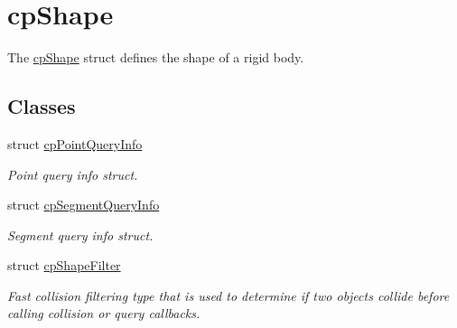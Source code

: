 \hypertarget{group__cp_shape}{}\section{cp\+Shape}
\label{group__cp_shape}


The \hyperlink{structcp_shape}{cp\+Shape} struct defines the shape of a rigid body.  


\subsection*{Classes}
\begin{DoxyCompactItemize}
\item 
struct \hyperlink{structcp_point_query_info}{cp\+Point\+Query\+Info}
\begin{DoxyCompactList}\small\item\em Point query info struct. \end{DoxyCompactList}\item 
struct \hyperlink{structcp_segment_query_info}{cp\+Segment\+Query\+Info}
\begin{DoxyCompactList}\small\item\em Segment query info struct. \end{DoxyCompactList}\item 
struct \hyperlink{structcp_shape_filter}{cp\+Shape\+Filter}
\begin{DoxyCompactList}\small\item\em Fast collision filtering type that is used to determine if two objects collide before calling collision or query callbacks. \end{DoxyCompactList}\end{DoxyCompactItemize}
